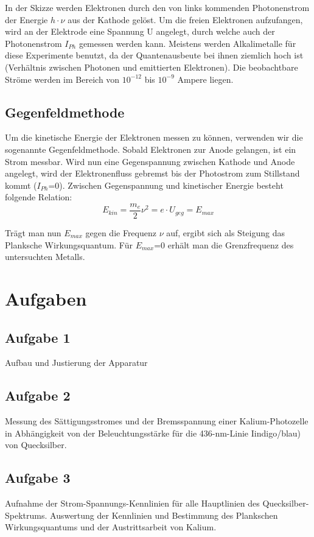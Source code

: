 \documentclass{article}
\begin{document}
In der Skizze werden Elektronen durch den von links kommenden Photonenstrom der Energie \(h\cdot \nu\) aus der Kathode gelöst. Um die freien Elektronen aufzufangen, wird an der Elektrode eine Spannung U angelegt, durch welche auch der Photonenstrom \(I_{Ph}\) gemessen werden kann. Meistens werden Alkalimetalle für diese Experimente benutzt, da der Quantenausbeute bei ihnen ziemlich hoch ist (Verhältnis zwischen Photonen und emittierten Elektronen). Die beobachtbare Ströme werden im Bereich von \(10^{-12}\) bis \(10^{-9}\) Ampere liegen.

\subsection{Gegenfeldmethode}
Um die kinetische Energie der Elektronen messen zu können, verwenden wir die sogenannte Gegenfeldmethode. Sobald Elektronen zur Anode gelangen, ist ein Strom messbar. Wird nun eine Gegenspannung zwischen Kathode und Anode angelegt, wird der Elektronenfluss gebremst bis der Photostrom zum Stillstand kommt (\(I_{Ph}\)=0). Zwischen Gegenspannung und kinetischer Energie besteht folgende Relation:
\begin{equation}
E_{kin}=\frac{m_e}{2}\nu^2 =e\cdot U_{geg} = E_{max}
\end{equation}

Trägt man nun \(E_{max}\) gegen die Frequenz \(\nu\) auf, ergibt sich als Steigung das Planksche Wirkungsquantum. Für \(E_{max}\)=0 erhält man die Grenzfrequenz des untersuchten Metalls.
\newpage
\section{Aufgaben}

\subsection{Aufgabe 1}
Aufbau und Justierung der Apparatur

\subsection{Aufgabe 2}
Messung des Sättigungsstromes und der Bremsspannung einer Kalium-Photozelle in Abhängigkeit von der Beleuchtungsstärke für die 436-nm-Linie Iindigo/blau) von Quecksilber.

\subsection{Aufgabe 3}
Aufnahme der Strom-Spannungs-Kennlinien für alle Hauptlinien des Quecksilber-Spektrums. Auswertung der Kennlinien und Bestimmung des Plankschen Wirkungsquantums und der Austrittsarbeit von Kalium.
\end{document}
